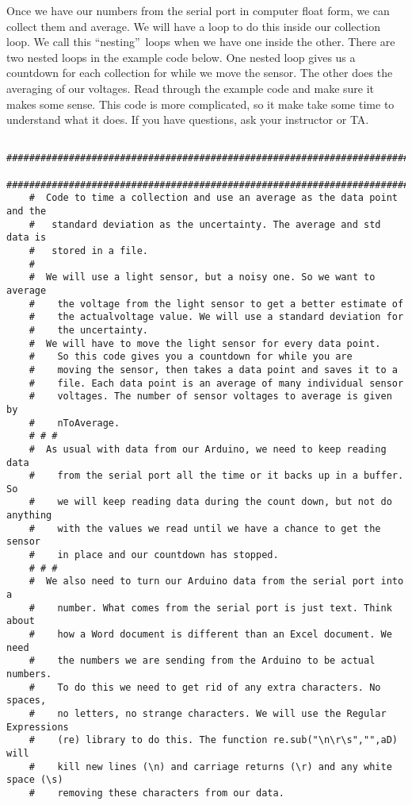 Once we have our numbers from the serial port in computer float form, we can
collect them and average. We will have a loop to do this inside our
collection loop. We call this \textquotedblleft nesting\textquotedblright\
loops when we have one inside the other. There are two nested loops in the
example code below. One nested loop gives us a countdown for each collection
for while we move the sensor. The other does the averaging of our voltages.
Read through the example code and make sure it makes some sense. This code
is more complicated, so it make take some time to understand what it does.
If you have questions, ask your instructor or TA.
\begin{verbatim}
	##########################################################################
	##########################################################################
	#  Code to time a collection and use an average as the data point and the 
	#   standard deviation as the uncertainty. The average and std data is 
	#   stored in a file.
	#
	#  We will use a light sensor, but a noisy one. So we want to average 
	#    the voltage from the light sensor to get a better estimate of 
	#    the actualvoltage value. We will use a standard deviation for 
	#    the uncertainty.
	#  We will have to move the light sensor for every data point. 
	#    So this code gives you a countdown for while you are 
	#    moving the sensor, then takes a data point and saves it to a 
	#    file. Each data point is an average of many individual sensor 
	#    voltages. The number of sensor voltages to average is given by 
	#    nToAverage.
	# # # 
	#  As usual with data from our Arduino, we need to keep reading data 
	#    from the serial port all the time or it backs up in a buffer. So 
	#    we will keep reading data during the count down, but not do anything 
	#    with the values we read until we have a chance to get the sensor 
	#    in place and our countdown has stopped.
	# # #
	#  We also need to turn our Arduino data from the serial port into a 
	#    number. What comes from the serial port is just text. Think about 
	#    how a Word document is different than an Excel document. We need 
	#    the numbers we are sending from the Arduino to be actual numbers.  
	#    To do this we need to get rid of any extra characters. No spaces, 
	#    no letters, no strange characters. We will use the Regular Expressions 
	#    (re) library to do this. The function re.sub("\n\r\s","",aD) will 
	#    kill new lines (\n) and carriage returns (\r) and any white space (\s)
	#    removing these characters from our data.
	

\end{verbatim}
